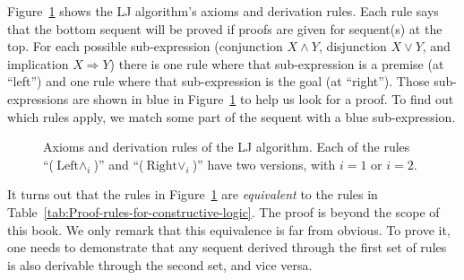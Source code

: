 Figure~\ref{fig:Rules-of-the-LJ-algorithm} shows the LJ algorithm\textsf{'}s
axioms and derivation rules. Each rule says that the bottom sequent
will be proved if proofs are given for sequent(s) at the top. For
each possible sub-expression (conjunction $X\wedge Y$, disjunction
$X\vee Y$, and implication $X\Rightarrow Y$) there is one rule where
that sub-expression is a premise (at \textsf{``}left\textsf{''}) and one rule where
that sub-expression is the goal (at \textsf{``}right\textsf{''}). Those sub-expressions
are shown in blue in Figure~\ref{fig:Rules-of-the-LJ-algorithm}
to help us look for a proof. To find out which rules apply, we match
some part of the sequent with a blue sub-expression.

\begin{figure}
\begin{centering}
\par\end{centering}
\caption{Axioms and derivation rules of the LJ algorithm. Each of the rules
\textquotedblleft ($\text{Left}\wedge_{i}$)\textquotedblright{} and
\textquotedblleft ($\text{Right}\vee_{i}$)\textquotedblright{} have
two versions, with $i=1$ or $i=2$. \label{fig:Rules-of-the-LJ-algorithm}}
\end{figure}

It turns out that the rules in Figure~\ref{fig:Rules-of-the-LJ-algorithm}
are \emph{equivalent} to the rules in Table~\ref{tab:Proof-rules-for-constructive-logic}.
The proof is beyond the scope of this book. We only remark that this
equivalence is far from obvious. To prove it, one needs to demonstrate
that any sequent derived through the first set of rules is also derivable
through the second set, and vice versa.

